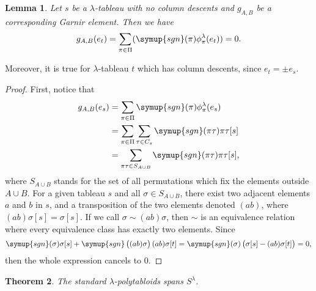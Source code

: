 \documentclass{assignment}[2019/10/15]
\theoremstyle{plain}
\newtheorem{theorem}{Theorem}[section]
\newtheorem{lemma}[theorem]{Lemma}
\newcommand{\sgn}{\mathop{}\!\symup{sgn}}
\numberwithin{equation}{section}
\begin{document}
    \begin{lemma}\label{lem: Garnir}
        Let $s$ be a $\lambda$-tableau with no column descents and $g_{A, B}$ be a corresponding Garnir element. Then we have
        \begin{equation}
            g_{A, B}(e_t) = \sum_{\pi\in\Pi}(\sgn(\pi)\phi_\pi^\lambda(e_t))=0.
        \end{equation}
    \end{lemma}

    Moreover, it is true for $\lambda$-tableau $t$ which has column descents, since $e_t=\pm e_s$.

    \begin{proof}
        First, notice that
        \begin{equation}
            \begin{aligned}
                g_{A, B}(e_s)
                &= \sum_{\pi\in\Pi}\sgn(\pi)\phi_\pi^\lambda(e_s)\\
                &= \sum_{\pi\in\Pi}\sum_{\tau\in C_s}\sgn(\pi\tau)\pi\tau[s]\\
                &= \sum_{\pi\tau\in S_{A\cup B}}\sgn(\pi\tau)\pi\tau[s],
            \end{aligned}
        \end{equation}
        where $S_{A\cup B}$ stands for the set of all permutations which fix the elements outside $A\cup B$. For a given tableau $s$ and all $\sigma\in S_{A\cup B}$, there exist two adjacent elements $a$ and $b$ in $s$, and a transposition of the two elements denoted $(a b)$, where $(a b)\sigma[s] = \sigma[s]$. If we call $\sigma\sim (a b)\sigma$, then $\sim$ is an equivalence relation where every equivalence class has exactly two elements. Since
        \begin{equation}
            \sgn(\sigma)\sigma[s] + \sgn\left((a b)\sigma\right)(a b)\sigma[t] = \sgn(\sigma)\left(\sigma[s]-(a b)\sigma[t]\right) = 0,
        \end{equation}
        then the whole expression cancels to 0.
    \end{proof}

    \begin{theorem}
        The standard $\lambda$-polytabloids spans $S^\lambda$.
    \end{theorem}
\end{document}

